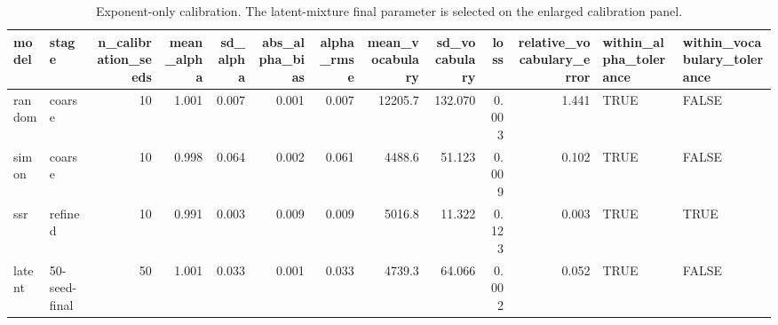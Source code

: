 \begin{table}

\caption{\label{tab:calibration-tables}Exponent-only calibration. The latent-mixture final parameter is selected on the enlarged calibration panel.}
\centering
\begin{tabular}[t]{llrrrrrrrrrll}
\toprule
model & stage & n\_calibration\_seeds & mean\_alpha & sd\_alpha & abs\_alpha\_bias & alpha\_rmse & mean\_vocabulary & sd\_vocabulary & loss & relative\_vocabulary\_error & within\_alpha\_tolerance & within\_vocabulary\_tolerance\\
\midrule
random & coarse & 10 & 1.001 & 0.007 & 0.001 & 0.007 & 12205.7 & 132.070 & 0.003 & 1.441 & TRUE & FALSE\\
simon & coarse & 10 & 0.998 & 0.064 & 0.002 & 0.061 & 4488.6 & 51.123 & 0.009 & 0.102 & TRUE & FALSE\\
ssr & refined & 10 & 0.991 & 0.003 & 0.009 & 0.009 & 5016.8 & 11.322 & 0.123 & 0.003 & TRUE & TRUE\\
latent & 50-seed-final & 50 & 1.001 & 0.033 & 0.001 & 0.033 & 4739.3 & 64.066 & 0.002 & 0.052 & TRUE & FALSE\\
\bottomrule
\end{tabular}
\end{table}
